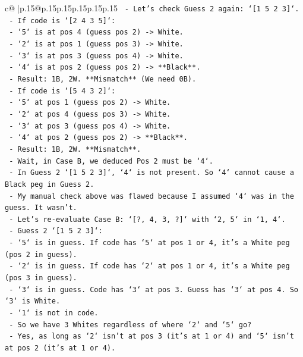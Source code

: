 \documentclass{article}
\begin{document}
{\begin{supertabular}{c@{$\;$}|p{.15\linewidth}@{}p{.15\linewidth}p{.15\linewidth}p{.15\linewidth}p{.15\linewidth}p{.15\linewidth}}
{{{\texttt{   {-} Let's check Guess 2 again: `{[}1 5 2 3{]}`.} \\
\texttt{     {-} If code is `{[}2 4 3 5{]}`:} \\
\texttt{       {-} `5` is at pos 4 (guess pos 2) {-}> White.} \\
\texttt{       {-} `2` is at pos 1 (guess pos 3) {-}> White.} \\
\texttt{       {-} `3` is at pos 3 (guess pos 4) {-}> White.} \\
\texttt{       {-} `4` is at pos 2 (guess pos 2) {-}> **Black**.} \\
\texttt{       {-} Result: 1B, 2W. **Mismatch** (We need 0B).} \\
\texttt{     {-} If code is `{[}5 4 3 2{]}`:} \\
\texttt{       {-} `5` at pos 1 (guess pos 2) {-}> White.} \\
\texttt{       {-} `2` at pos 4 (guess pos 3) {-}> White.} \\
\texttt{       {-} `3` at pos 3 (guess pos 4) {-}> White.} \\
\texttt{       {-} `4` at pos 2 (guess pos 2) {-}> **Black**.} \\
\texttt{       {-} Result: 1B, 2W. **Mismatch**.} \\
\texttt{   {-} Wait, in Case B, we deduced Pos 2 must be `4`.} \\
\texttt{   {-} In Guess 2 `{[}1 5 2 3{]}`, `4` is not present. So `4` cannot cause a Black peg in Guess 2.} \\
\texttt{   {-} My manual check above was flawed because I assumed `4` was in the guess. It wasn't.} \\
\texttt{   {-} Let's re{-}evaluate Case B: `{[}?, 4, 3, ?{]}` with `2, 5` in `1, 4`.} \\
\texttt{   {-} Guess 2 `{[}1 5 2 3{]}`:} \\
\texttt{     {-} `5` is in guess. If code has `5` at pos 1 or 4, it's a White peg (pos 2 in guess).} \\
\texttt{     {-} `2` is in guess. If code has `2` at pos 1 or 4, it's a White peg (pos 3 in guess).} \\
\texttt{     {-} `3` is in guess. Code has `3` at pos 3. Guess has `3` at pos 4. So `3` is White.} \\
\texttt{     {-} `1` is not in code.} \\
\texttt{     {-} So we have 3 Whites regardless of where `2` and `5` go?} \\
\texttt{     {-} Yes, as long as `2` isn't at pos 3 (it's at 1 or 4) and `5` isn't at pos 2 (it's at 1 or 4).} \\
}}}
\end{supertabular}}
\end{document}
